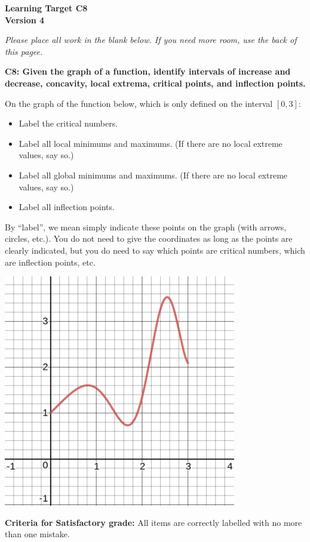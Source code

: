 \documentclass[10pt]{article}
\begin{document}
	\vspace*{0in}

		\begin{center}
			\textbf{Learning Target C8 \\
			Version 4}
		\end{center}

\emph{Please place all work in the blank below. If you need more room, use the back of this pagee.}

\begin{framed}
	\textbf{C8: Given the graph of a function, identify intervals of increase and decrease, concavity, local extrema, critical points, and inflection points. }
\end{framed}


On the graph of the function below, which is only defined on the interval $[0,3]$: 

\begin{itemize}
    \item Label the critical numbers. 
    \item Label all local minimums and maximums. (If there are no local extreme values, say so.) 
    \item Label all global minimums and maximums. (If there are no local extreme values, say so.) 
    \item Label all inflection points. 
\end{itemize}
By ``label'', we mean simply indicate these points on the graph (with arrows, circles, etc.). You do not need to give the coordinates as long as the points are clearly indicated, but you do need to say which points are critical numbers, which are inflection points, etc. 

\begin{center}
    \includegraphics[width=4in]{ltc8-nov19.png}
\end{center}

\vfill

\begin{small}
    \begin{framed}
        	\textbf{Criteria for Satisfactory grade:} All items are correctly labelled with no more than one mistake. 
    \end{framed}

\end{small}
\end{document}
